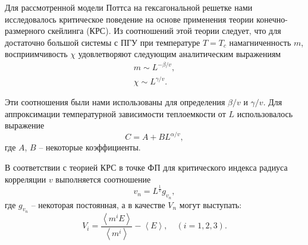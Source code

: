Для рассмотренной модели Поттса на гексагональной решетке нами исследовалось критическое поведение на основе применения теории конечно-размерного скейлинга (КРС). Из соотношений этой теории следует, что для достаточно большой системы с ПГУ при температуре $T=T_c$ намагниченность $m$, восприимчивость $\chi$ удовлетворяют следующим аналитическим выражениям \cite{bib:bab-15}
\begin{gather}
    \label{eq:bab-9}
    m \sim L^{-\beta / v}, \\
    \label{eq:bab-10}
    \chi \sim L^{\gamma / v}.
\end{gather}

Эти соотношения были нами использованы для определения $\beta / v$ и $\gamma / v$. Для аппроксимации температурной зависимости теплоемкости от $L$ использовалось выражение
\begin{equation}
    \label{eq:bab-11}
    C = A + BL^{\alpha / v},
\end{equation}
где $A$, $B$ -- некоторые коэффициенты.

В соответствии с теорией КРС в точке ФП для критического индекса радиуса корреляции $v$ выполняется соотношение \cite{bib:bab-16}
\begin{equation}
    \label{eq:bab-12}
    v_n = L^{\frac{1}{v}} g_{v_n},
\end{equation}
где $g_{v_n}$ -- некоторая постоянная, а в качестве $V_n$ могут выступать:
\begin{equation*}
    V_i = \frac{\left<m^i E\right>}{\left<m^i\right>} - \left<E\right>, \quad (i = 1, 2, 3).
\end{equation*}

